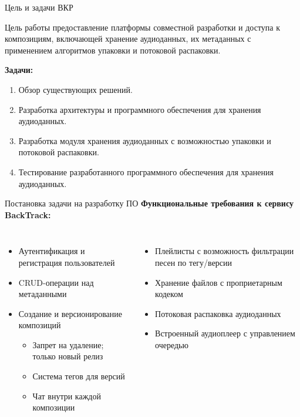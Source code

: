 \documentclass[aspectratio=169,10pt]{beamer}
\begin{document}
\begin{frame}{Цель и задачи ВКР}
  \begin{block}{Цель работы}    
    предоставление платформы совместной разработки и доступа к композициям, включающей хранение аудиоданных, их метаданных с применением алгоритмов упаковки и потоковой распаковки.
  \end{block}

  \vspace{0.4em}
  \textbf{Задачи:}
  \begin{enumerate}
    \item Обзор существующих решений.
    \item Разработка архитектуры и программного обеспечения для хранения аудиоданных.
    \item Разработка модуля хранения аудиоданных с возможностью упаковки и потоковой распаковки.
    \item Тестирование разработанного программного обеспечения для хранения аудиоданных.
  \end{enumerate}
\end{frame}

\begin{frame}{Постановка задачи на разработку ПО}
  \textbf{Функциональные требования к сервису BackTrack:}
  \begin{columns}[t]
      \begin{itemize}
        \item Аутентификация и регистрация пользователей
        \item CRUD-операции над метаданными
        \item Создание и версионирование композиций
        \begin{itemize}
          \item[\textendash] Запрет на удаление; только новый релиз
          \item[\textendash] Система тегов для версий
          \item[\textendash] Чат внутри каждой композиции
        \end{itemize}
      \end{itemize}
      \begin{itemize}
        \item Плейлисты с возможность фильтрации песен по тегу/версии
        \item Хранение файлов с проприетарным кодеком
        \item Потоковая распаковка аудиоданных
        \item Встроенный аудиоплеер с управлением очередью
      \end{itemize}
  \end{columns}
\end{frame}
\end{document}
